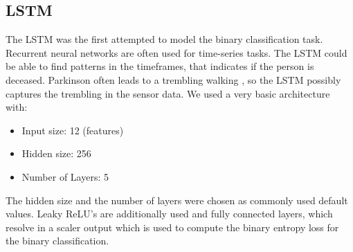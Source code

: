 \documentclass[journal]{IEEEtran}
\begin{document}
\subsection{LSTM}
The LSTM was the first attempted to model the binary classification task. Recurrent neural networks are often used for time-series tasks. The LSTM could be able to find patterns in the timeframes, that indicates if the person is deceased. Parkinson often leads to a trembling walking \cite{cite1}, so the LSTM possibly captures the trembling in the sensor data. We used a very basic architecture with:

\begin{itemize}
\item Input size: 12 (features)
\item Hidden size: 256
\item Number of Layers: 5
\end{itemize}

The hidden size and the number of layers were chosen as commonly used default values. Leaky ReLU's are additionally used and fully connected layers, which resolve in a scaler output which is used to compute the binary entropy loss for the binary classification. 
\end{document}

